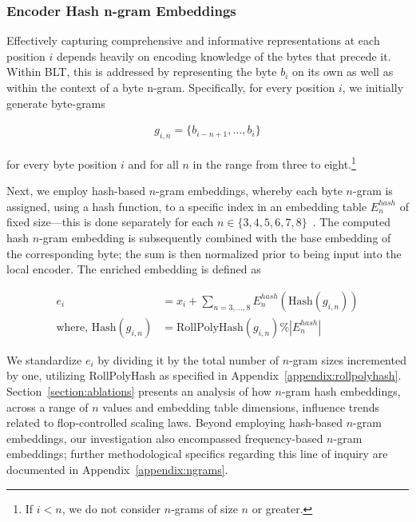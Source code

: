 \subsubsection{Encoder Hash n-gram Embeddings}
\label{sec:ngram-emb}
\label{sec:hash-emb}
Effectively capturing comprehensive and informative representations at each position $i$ depends heavily on encoding knowledge of the bytes that precede it. Within {\textsc BLT}, this is addressed by representing the byte $b_i$ on its own as well as within the context of a byte n-gram. Specifically, for every position $i$, we initially generate byte-grams

\begin{align}
    g_{i,n}=\{b_{i-n + 1},\ldots, b_i\}
\end{align}

for every byte position $i$ and for all $n$ in the range from three to eight.\footnote{
If $i < n$, we do not consider $n$-grams of size $n$ or greater.}

Next, we employ hash-based $n$-gram embeddings, whereby each byte $n$-gram is assigned, using a hash function, to a specific index in an embedding table $E_{n}^{hash}$ of fixed size—this is done separately for each $n \in\{3,4,5,6,7,8\}$~\citep{bai2010learning}. The computed hash $n$-gram embedding is subsequently combined with the base embedding of the corresponding byte; the sum is then normalized prior to being input into the local encoder. The enriched embedding is defined as

\begin{align}
e_i &= x_i + \sum_{n = 3,...,8}E_{n}^{hash}(\text{Hash}(g_{i,n})) \\
\text{where, Hash}(g_{i,n}) &= \text{RollPolyHash}(g_{i,n}) \% |E_{n}^{hash}|
\end{align}

We standardize $e_i$ by dividing it by the total number of $n$-gram sizes incremented by one, utilizing RollPolyHash as specified in Appendix~\ref{appendix:rollpolyhash}. Section~\ref{section:ablations} presents an analysis of how $n$-gram hash embeddings, across a range of $n$ values and embedding table dimensions, influence trends related to flop-controlled scaling laws. Beyond employing hash-based $n$-gram embeddings, our investigation also encompassed frequency-based $n$-gram embeddings; further methodological specifics regarding this line of inquiry are documented in Appendix~\ref{appendix:ngrams}.

